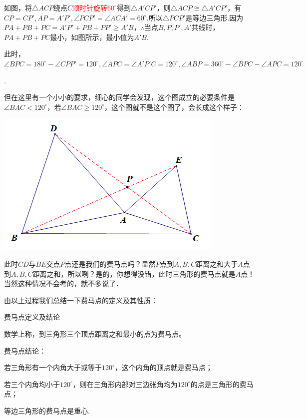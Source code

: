 \documentclass[10pt]{ctexart}
\begin{document}
{\kaishu\color{blue}如图，将$\triangle ACP$绕点$C$\textcolor{red}{顺时针旋转$60^\circ$}得到$\triangle A'CP'$，则$\triangle ACP \cong \triangle A'CP'$，有$CP=CP',AP=A'P',\angle PCP'=\angle ACA'=60^\circ$.所以$\triangle PCP'$是等边三角形.因为$PA+PB+PC=A'P'+PB+PP'\geqslant A'B$，$\therefore$当点$B,P,P',A'$共线时，$PA+PB+PC$最小，如图所示，最小值为$A'B$.

此时，$\angle BPC=180^\circ-\angle CPP'=120^\circ,\angle APC=\angle A'P'C=120^\circ,\angle ABP=360^\circ-\angle BPC-\angle APC=120^\circ$}.

但在这里有一个小小的要求，细心的同学会发现，这个图成立的必要条件是$\angle BAC<120^\circ$，若$\angle BAC \geqslant 120^\circ$，这个图就不是这个图了，会长成这个样子：

\begin{center}
	\includegraphics[scale=0.6]{figure/feimadian04}
\end{center}

此时$CD$与$BE$交点$P$点还是我们的费马点吗？显然$P$点到$A,B,C$距离之和大于$A$点到$A,B,C$距离之和，所以咧？是的，你想得没错，此时三角形的费马点就是$A$点！当然这种情况不会考的，就不多说了．



由以上过程我们总结一下费马点的定义及其性质：
\begin{custom}{费马点定义及结论}{}
{\kaishu\color{blue}	数学上称，到三角形三个顶点距离之和最小的点为费马点。
	
	费马点结论：
	
	若三角形有一个内角大于或等于$120^\circ$，这个内角的顶点就是费马点；
	
	若三个内角均小于$120^\circ$，则在三角形内部对三边张角均为$120^\circ$的点是三角形的费马点；
	
	等边三角形的费马点是重心.}
\end{custom}
\end{document}
